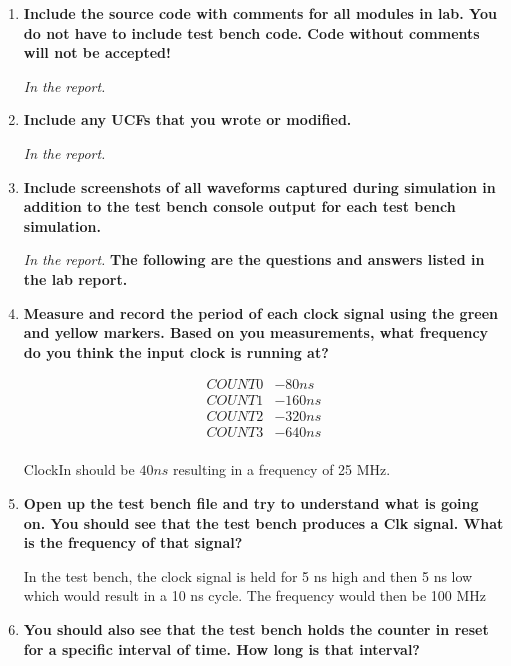 \documentclass[a4paper,12pt]{article}
\begin{document}
\begin{enumerate}
  \item \textbf{Include the source code with comments for all modules in lab. You do not have to include test bench
  code. Code without comments will not be accepted!}

  \textit{In the report.}
  
  \item \textbf{Include any UCFs that you wrote or modified.}

  \textit{In the report.}
  
  \item \textbf{Include screenshots of all waveforms captured during simulation in addition to the test bench console
  output for each test bench simulation.}

  \textit{In the report.}
  \textbf{The following are the questions and answers listed in the lab report.}

  \item \textbf{Measure and record the period of each clock signal using the green and yellow markers. 
  Based on you measurements, what frequency do you think the input clock is running at?}
  \vspace{-35pt}
  \begin{center}
    \begin{align*}
      COUNT0 &- 80 ns \\
      COUNT1 &- 160 ns \\
      COUNT2 &- 320 ns \\
      COUNT3 &- 640 ns \\
    \end{align*}
  \end{center}
  \vspace{-35pt}
  ClockIn should be $40 ns$ resulting in a frequency of 25 MHz.
  
  \item \textbf{Open up the test bench file and try to understand what is going on. You should see that the test
  bench produces a Clk signal. What is the frequency of that signal?}
  
  In the test bench, the clock signal is held for 5 ns high and then 5 ns low which would result in a 10 ns cycle. The frequency would then be 100 MHz
  
  \item \textbf{You should also see that the test bench holds the counter in reset for a specific interval of time. How long is that interval?}
  

\end{enumerate}
\end{document}
